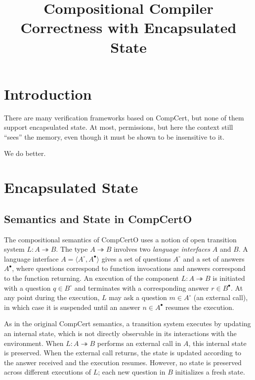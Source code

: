 \documentclass[acmsmall,screen,review,anonymous]{acmart}
\title{Compositional Compiler Correctness with Encapsulated State}
\newcommand{\que}{\circ}
\newcommand{\ans}{\bullet}
\begin{document}
\maketitle

\section{Introduction}

There are many verification frameworks based on CompCert,
but none of them support encapsulated state.
At most, permissions,
but here the context still ``sees'' the memory,
even though it must be shown to be insensitive to it.

We do better.

\section{Encapsulated State}

\subsection{Semantics and State in CompCertO}

The compositional semantics of CompCertO uses %
a notion of open transition system $L : A \twoheadrightarrow B$.
The type $A \twoheadrightarrow B$ involves
two \emph{language interfaces} $A$ and $B$.
A language interface $A = \langle A^\que, A^\ans \rangle$
gives a set of questions $A^\que$ and a set of answers $A^\ans$,
where questions correspond to function invocations
and answers correspond to the function returning.
An execution of the component $L : A \twoheadrightarrow B$
is initiated with a question $q \in B^\que$
and terminates with a corresponding answer $r \in B^\ans$.
At any point during the execution,
$L$ may ask a question $m \in A^\que$ (an external call),
in which case it is suspended until an answer $n \in A^\ans$
resumes the execution.

As in the original CompCert semantics,
a transition system
executes by updating an internal state,
which is not directly observable 
in its interactions with the environment.
When $L : A \twoheadrightarrow B$
performs an external call in $A$,
this internal state is preserved.
When the external call returns,
the state is updated according to the answer received
and the execution resumes.
However,
no state is preserved across different executions of $L$;
each new question in $B$ initializes a fresh state.
\end{document}
